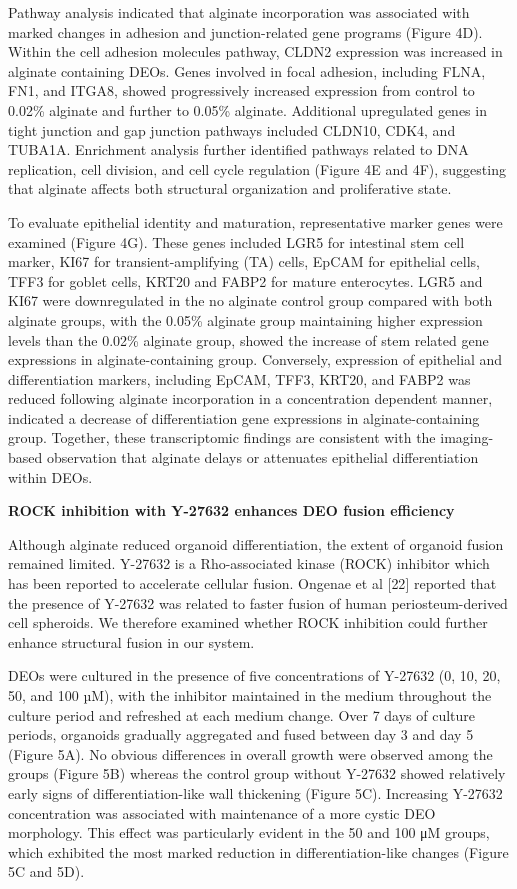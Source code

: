 \documentclass[
]{article}
\begin{document}
Pathway analysis indicated that alginate incorporation was associated with marked changes in adhesion and junction-related gene programs (Figure 4D). Within the cell adhesion molecules pathway, CLDN2 expression was increased in alginate containing DEOs. Genes involved in focal adhesion, including FLNA, FN1, and ITGA8, showed progressively increased expression from control to 0.02\% alginate and further to 0.05\% alginate. Additional upregulated genes in tight junction and gap junction pathways included CLDN10, CDK4, and TUBA1A. Enrichment analysis further identified pathways related to DNA replication, cell division, and cell cycle regulation (Figure 4E and 4F), suggesting that alginate affects both structural organization and proliferative state.

To evaluate epithelial identity and maturation, representative marker genes were examined (Figure 4G). These genes included LGR5 for intestinal stem cell marker, KI67 for transient-amplifying (TA) cells, EpCAM for epithelial cells, TFF3 for goblet cells, KRT20 and FABP2 for mature enterocytes. LGR5 and KI67 were downregulated in the no alginate control group compared with both alginate groups, with the 0.05\% alginate group maintaining higher expression levels than the 0.02\% alginate group, showed the increase of stem related gene expressions in alginate-containing group. Conversely, expression of epithelial and differentiation markers, including EpCAM, TFF3, KRT20, and FABP2 was reduced following alginate incorporation in a concentration dependent manner, indicated a decrease of differentiation gene expressions in alginate-containing group. Together, these transcriptomic findings are consistent with the imaging-based observation that alginate delays or attenuates epithelial differentiation within DEOs.

\textbf{ROCK inhibition with Y-27632 enhances DEO fusion efficiency}

Although alginate reduced organoid differentiation, the extent of organoid fusion remained limited. Y-27632 is a Rho-associated kinase (ROCK) inhibitor which has been reported to accelerate cellular fusion. Ongenae et al {[}22{]} reported that the presence of Y-27632 was related to faster fusion of human periosteum-derived cell spheroids. We therefore examined whether ROCK inhibition could further enhance structural fusion in our system.

DEOs were cultured in the presence of five concentrations of Y-27632 (0, 10, 20, 50, and 100 µM), with the inhibitor maintained in the medium throughout the culture period and refreshed at each medium change. Over 7 days of culture periods, organoids gradually aggregated and fused between day 3 and day 5 (Figure 5A). No obvious differences in overall growth were observed among the groups (Figure 5B) whereas the control group without Y-27632 showed relatively early signs of differentiation-like wall thickening (Figure 5C). Increasing Y-27632 concentration was associated with maintenance of a more cystic DEO morphology. This effect was particularly evident in the 50 and 100 μM groups, which exhibited the most marked reduction in differentiation-like changes (Figure 5C and 5D).
\end{document}
